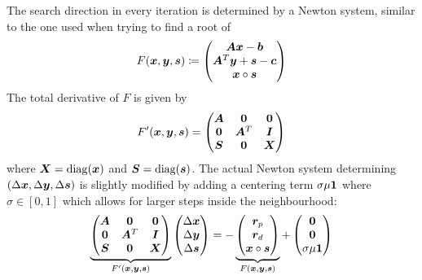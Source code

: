 The search direction in every iteration is determined by a Newton system, similar to the one used when trying to find a root of 
\begin{equation}
  F(\bm{x}, \bm{y}, \bm{s}) \coloneqq \begin{pmatrix} \bm{A}\bm{x} - \bm{b} \\ \bm{A}^T \bm{y} + \bm{s} - \bm{c} \\ \bm{x} \circ \bm{s} \end{pmatrix}
\end{equation}
The total derivative of \(F\) is given by
\begin{equation}
  F'(\bm{x}, \bm{y}, \bm{s}) = \begin{pmatrix}
    \bm{A} & \bm{0}   & \bm{0} \\
    \bm{0} & \bm{A}^T & \bm{I} \\
    \bm{S} & \bm{0}   & \bm{X} \\
  \end{pmatrix}
\end{equation}
where \(\bm{X} = \operatorname{diag}(\bm{x})\) and \(\bm{S} = \operatorname{diag}(\bm{s})\).
The actual Newton system determining \((\Delta\bm{x}, \Delta\bm{y}, \Delta\bm{s})\) is slightly modified by adding a centering term \(\sigma \mu \bm{1}\) where \(\sigma \in [0,1]\) which allows for larger steps inside the neighbourhood:
\begin{equation} \label{eqn:newton-system}
  \underbrace{
  \begin{pmatrix}
    \bm{A} & \bm{0}   & \bm{0} \\
    \bm{0} & \bm{A}^T & \bm{I} \\
    \bm{S} & \bm{0}   & \bm{X} \\
  \end{pmatrix}
  }_{F'(\bm{x}, \bm{y}, \bm{s})}
  \begin{pmatrix} \Delta\bm{x} \\ \Delta\bm{y} \\ \Delta\bm{s} \end{pmatrix}
  = -
  \underbrace{
  \begin{pmatrix} \bm{r}_p \\ \bm{r}_d \\ \bm{x} \circ \bm{s} \end{pmatrix}
  }_{F(\bm{x}, \bm{y}, \bm{s})}
  + \begin{pmatrix} \bm{0} \\ \bm{0} \\ \sigma \mu \bm{1} \end{pmatrix}
\end{equation}

